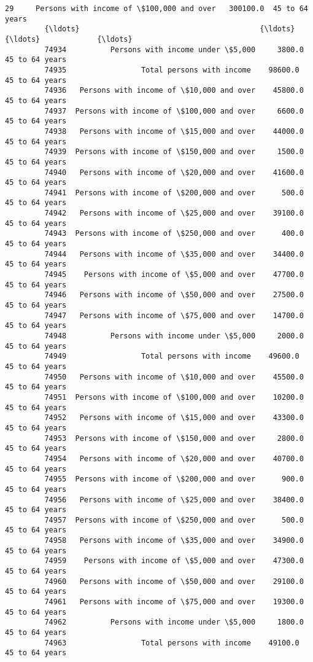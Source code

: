 \documentclass[11pt]{article}
\begin{document}
\begin{Verbatim}[commandchars=\\\{\}]
         29     Persons with income of \$100,000 and over   300100.0  45 to 64 years   
         {\ldots}                                         {\ldots}        {\ldots}             {\ldots}   
         74934          Persons with income under \$5,000     3800.0  45 to 64 years   
         74935                 Total persons with income    98600.0  45 to 64 years   
         74936   Persons with income of \$10,000 and over    45800.0  45 to 64 years   
         74937  Persons with income of \$100,000 and over     6600.0  45 to 64 years   
         74938   Persons with income of \$15,000 and over    44000.0  45 to 64 years   
         74939  Persons with income of \$150,000 and over     1500.0  45 to 64 years   
         74940   Persons with income of \$20,000 and over    41600.0  45 to 64 years   
         74941  Persons with income of \$200,000 and over      500.0  45 to 64 years   
         74942   Persons with income of \$25,000 and over    39100.0  45 to 64 years   
         74943  Persons with income of \$250,000 and over      400.0  45 to 64 years   
         74944   Persons with income of \$35,000 and over    34400.0  45 to 64 years   
         74945    Persons with income of \$5,000 and over    47700.0  45 to 64 years   
         74946   Persons with income of \$50,000 and over    27500.0  45 to 64 years   
         74947   Persons with income of \$75,000 and over    14700.0  45 to 64 years   
         74948          Persons with income under \$5,000     2000.0  45 to 64 years   
         74949                 Total persons with income    49600.0  45 to 64 years   
         74950   Persons with income of \$10,000 and over    45500.0  45 to 64 years   
         74951  Persons with income of \$100,000 and over    10200.0  45 to 64 years   
         74952   Persons with income of \$15,000 and over    43300.0  45 to 64 years   
         74953  Persons with income of \$150,000 and over     2800.0  45 to 64 years   
         74954   Persons with income of \$20,000 and over    40700.0  45 to 64 years   
         74955  Persons with income of \$200,000 and over      900.0  45 to 64 years   
         74956   Persons with income of \$25,000 and over    38400.0  45 to 64 years   
         74957  Persons with income of \$250,000 and over      500.0  45 to 64 years   
         74958   Persons with income of \$35,000 and over    34900.0  45 to 64 years   
         74959    Persons with income of \$5,000 and over    47300.0  45 to 64 years   
         74960   Persons with income of \$50,000 and over    29100.0  45 to 64 years   
         74961   Persons with income of \$75,000 and over    19300.0  45 to 64 years   
         74962          Persons with income under \$5,000     1800.0  45 to 64 years   
         74963                 Total persons with income    49100.0  45 to 64 years   
         

\end{Verbatim}
\end{document}

